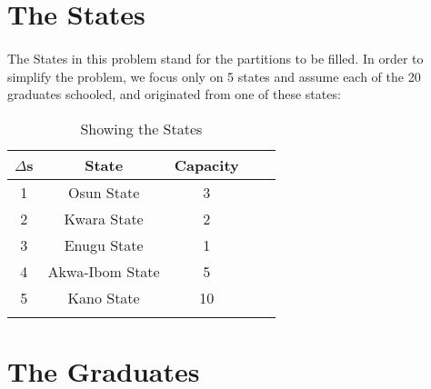 \documentclass[a4paper,openany]{book}
\begin{document}
		\section{The States}
			\paragraph{}
				The States in this problem stand for the partitions to be filled. In order to simplify the problem, we focus only on 5 states and assume each of the 20 graduates schooled, and originated from one of these states:
					\begin{longtable}{|c|c|c|c|c|}
						\hline
						\textbf{$\Delta$s} & \textbf{State} & \textbf{Capacity} \\
						\hline						
						\endhead
						1 & Osun State & 3\\
						\hline
						2 & Kwara State & 2\\
						\hline
						3 & Enugu State & 1\\
						\hline
						4 & Akwa-Ibom State & 5\\
						\hline
						5 & Kano State & 10\\
						\hline
						\caption{Showing the States\label{ex:tablex}}
					\end{longtable}		
		\section{The Graduates}
\end{document}
